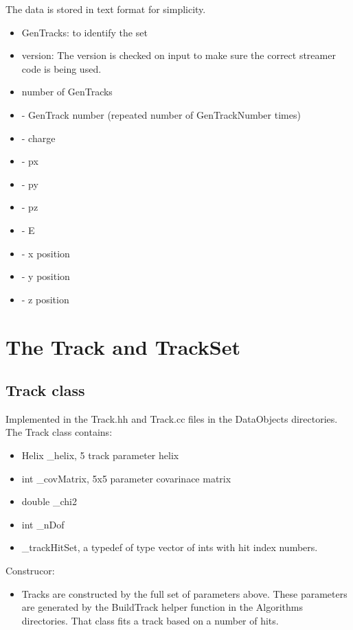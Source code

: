\documentclass[aps,prd,superscriptaddress,floatfix]{revtex4}
\begin{document}
The data is stored in text format for simplicity.

\begin{itemize}
\item  GenTracks: to identify the set
\item version: The version is checked on input to make sure the correct streamer code is being used.
\item number of GenTracks
\item - GenTrack number (repeated number of GenTrackNumber times)
\item - charge
\item - px
\item - py
\item - pz
\item - E
\item - x position
\item - y position
\item - z position
\end{itemize}

\section{The Track and TrackSet}
\subsection{Track class}
Implemented in the Track.hh and Track.cc files in the DataObjects directories.
\\

The Track class contains:
\begin{itemize}
\item Helix \_helix, 5 track parameter helix
\item int \_covMatrix, 5x5 parameter covarinace matrix
\item double \_chi2
\item int \_nDof
\item \_trackHitSet, a typedef of type vector of ints with hit index numbers.
\end{itemize}


Construcor:
\begin{itemize}
\item Tracks are constructed by the full set of parameters above.  These parameters
are generated by the BuildTrack helper function in the Algorithms directories.
That class fits a track based on a number of hits.
\end{itemize}
\end{document}
